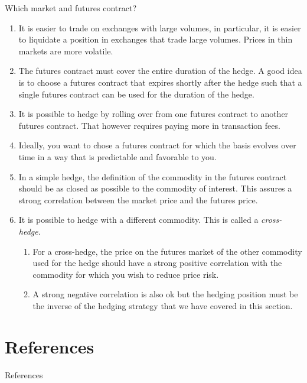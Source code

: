 \documentclass[table,xcolor=pdftex,dvipsnames]{beamer}\usepackage[]{graphicx}\usepackage[]{color}
\begin{document}
\begin{frame}[allowframebreaks]{Which market and futures contract?}
\begin{enumerate}[label=\textbullet]
  \item It is easier to trade on exchanges with large volumes, in particular, it is easier to liquidate a position in exchanges that trade large volumes. Prices in thin markets are more volatile.
  \item The futures contract must cover the entire duration of the hedge. A good idea is to choose a futures contract that expires shortly after the hedge such that a single futures contract can be used for the duration of the hedge.
  \item It is possible to hedge by rolling over from one futures contract to another futures contract. That however requires paying more in transaction fees.
  \item Ideally, you want to chose a futures contract for which the basis evolves over time in a way that is predictable and favorable to you.
  \item In a simple hedge, the definition of the commodity in the futures contract should be as closed as possible to the commodity of interest. This assures a strong correlation between the market price and the futures price.
  \item It is possible to hedge with a different commodity. This is called a \emph{cross-hedge}.
            \begin{enumerate}[label=-]
            \item For a cross-hedge, the price on the futures market of the other commodity used for the hedge should have a strong positive correlation with the commodity for which you wish to reduce price risk.
            \item A strong negative correlation is also ok but the hedging position must be the inverse of the hedging strategy that we have covered in this section.
      \end{enumerate}
\end{enumerate}
\end{frame}

\section[References]{References}
\renewcommand\refname{References}
\def\newblock{References}
\begin{frame}[allowframebreaks]{References}

%
\end{frame}


\end{document}
